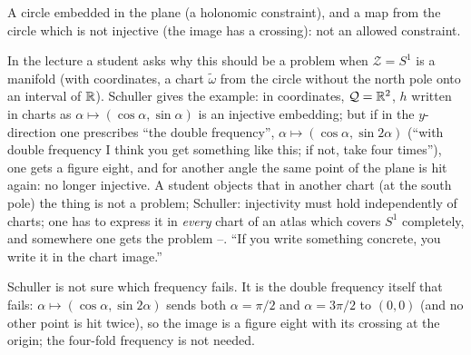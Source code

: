 \begin{paracol}{2}
\begin{nfigure}
\caption*{A circle embedded in the plane (a holonomic constraint), and a map from the circle which is not injective (the image has a crossing): not an allowed constraint.}
\end{nfigure}
In the lecture a student asks  why this should be a problem when $\mathcal Z=S^1$ is a manifold (with coordinates, a chart $\tilde\omega$ from the circle without the north pole onto an interval of $\mathbb{R}$). Schuller gives the example: in coordinates, $\mathcal Q=\mathbb{R}^2$, $h$ written in charts as $\alpha\mapsto(\cos\alpha,\sin\alpha)$ is an injective embedding; but if in the $y$-direction one prescribes ``the double frequency'', $\alpha\mapsto(\cos\alpha,\sin2\alpha)$ (``with double frequency I think you get something like this; if not, take four times''), one gets a figure eight, and for another angle the same point of the plane is hit again: no longer injective. A student objects that in another chart (at the south pole) the thing is not a problem; Schuller: injectivity must hold independently of charts; one has to express it in \emph{every} chart of an atlas which covers $S^1$ completely, and somewhere one gets the problem --. ``If you write something concrete, you write it in the chart image.''

\begin{coursenote}\label{cn:zw-eight}
Schuller is not sure which frequency fails. It is the double frequency itself that fails: $\alpha\mapsto(\cos\alpha,\sin2\alpha)$ sends both $\alpha=\pi/2$ and $\alpha=3\pi/2$ to $(0,0)$ (and no other point is hit twice), so the image is a figure eight with its crossing at the origin; the four-fold frequency is not needed.
\end{coursenote}


\end{paracol}
